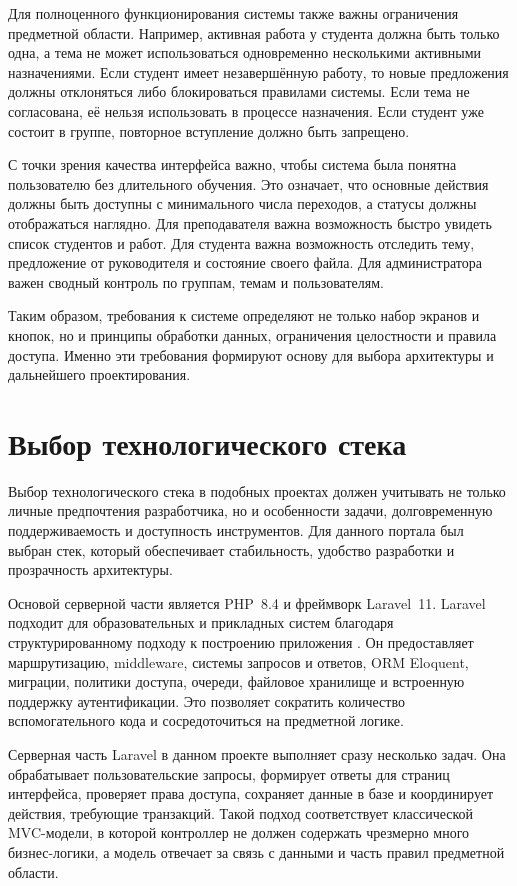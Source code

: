 \documentclass[14pt,a4paper]{extreport}
\begin{document}
Для полноценного функционирования системы также важны ограничения предметной
области.
Например, активная работа у студента должна быть только одна, а тема не
может использоваться одновременно несколькими активными назначениями.
Если студент имеет незавершённую работу, то новые предложения должны
отклоняться либо блокироваться правилами системы.
Если тема не согласована, её нельзя использовать в процессе назначения.
Если студент уже состоит в группе, повторное вступление должно быть
запрещено.

С точки зрения качества интерфейса важно, чтобы система была понятна
пользователю без длительного обучения.
Это означает, что основные действия должны быть доступны с минимального
числа переходов, а статусы должны отображаться наглядно.
Для преподавателя важна возможность быстро увидеть список студентов и работ.
Для студента важна возможность отследить тему, предложение от руководителя
и состояние своего файла.
Для администратора важен сводный контроль по группам, темам и пользователям.

Таким образом, требования к системе определяют не только набор экранов и
кнопок, но и принципы обработки данных, ограничения целостности и правила
доступа.
Именно эти требования формируют основу для выбора архитектуры и дальнейшего
проектирования.

\section{Выбор технологического стека}

Выбор технологического стека в подобных проектах должен учитывать не только
личные предпочтения разработчика, но и особенности задачи, долговременную
поддерживаемость и доступность инструментов.
Для данного портала был выбран стек, который обеспечивает стабильность,
удобство разработки и прозрачность архитектуры.

Основой серверной части является PHP~8.4 и фреймворк Laravel~11.
Laravel подходит для образовательных и прикладных систем благодаря
структурированному подходу к построению приложения \cite{ott}.
Он предоставляет маршрутизацию, middleware, системы запросов и ответов,
ORM Eloquent, миграции, политики доступа, очереди, файловое хранилище и
встроенную поддержку аутентификации.
Это позволяет сократить количество вспомогательного кода и сосредоточиться
на предметной логике.

Серверная часть Laravel в данном проекте выполняет сразу несколько задач.
Она обрабатывает пользовательские запросы, формирует ответы для страниц
интерфейса, проверяет права доступа, сохраняет данные в базе и координирует
действия, требующие транзакций.
Такой подход соответствует классической MVC-модели, в которой контроллер не
должен содержать чрезмерно много бизнес-логики, а модель отвечает за связь
с данными и часть правил предметной области.
\end{document}
